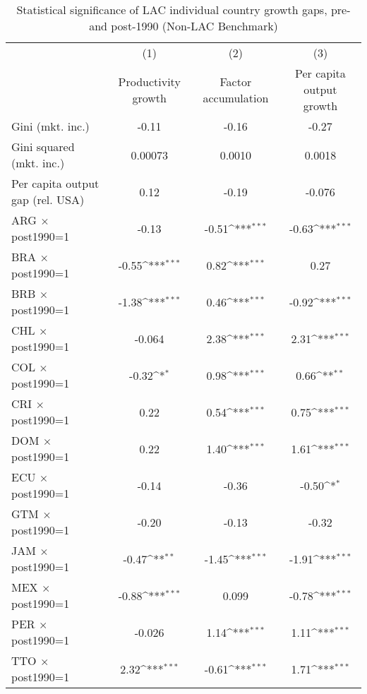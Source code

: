 \begin{sidewaystable}[htbp]\centering
\def\sym#1{\ifmmode^{#1}\else\(^{#1}\)\fi}
\caption{Statistical significance of LAC individual country growth gaps, pre- and post-1990 (Non-LAC Benchmark)}
\begin{tabular}{l*{3}{c}}
\toprule
                &\multicolumn{1}{c}{(1)}&\multicolumn{1}{c}{(2)}&\multicolumn{1}{c}{(3)}\\
                &\multicolumn{1}{c}{Productivity growth}&\multicolumn{1}{c}{Factor accumulation}&\multicolumn{1}{c}{Per capita output growth}\\
\midrule
Gini (mkt. inc.)&    -0.11         &    -0.16         &    -0.27         \\
Gini squared (mkt. inc.)&  0.00073         &   0.0010         &   0.0018         \\
Per capita output gap (rel. USA)&     0.12         &    -0.19         &   -0.076         \\
ARG $\times$ post1990=1&    -0.13         &    -0.51\sym{***}&    -0.63\sym{***}\\
BRA $\times$ post1990=1&    -0.55\sym{***}&     0.82\sym{***}&     0.27         \\
BRB $\times$ post1990=1&    -1.38\sym{***}&     0.46\sym{***}&    -0.92\sym{***}\\
CHL $\times$ post1990=1&   -0.064         &     2.38\sym{***}&     2.31\sym{***}\\
COL $\times$ post1990=1&    -0.32\sym{*}  &     0.98\sym{***}&     0.66\sym{**} \\
CRI $\times$ post1990=1&     0.22         &     0.54\sym{***}&     0.75\sym{***}\\
DOM $\times$ post1990=1&     0.22         &     1.40\sym{***}&     1.61\sym{***}\\
ECU $\times$ post1990=1&    -0.14         &    -0.36         &    -0.50\sym{*}  \\
GTM $\times$ post1990=1&    -0.20         &    -0.13         &    -0.32         \\
JAM $\times$ post1990=1&    -0.47\sym{**} &    -1.45\sym{***}&    -1.91\sym{***}\\
MEX $\times$ post1990=1&    -0.88\sym{***}&    0.099         &    -0.78\sym{***}\\
PER $\times$ post1990=1&   -0.026         &     1.14\sym{***}&     1.11\sym{***}\\
TTO $\times$ post1990=1&     2.32\sym{***}&    -0.61\sym{***}&     1.71\sym{***}\\

\end{tabular}
\end{sidewaystable}
